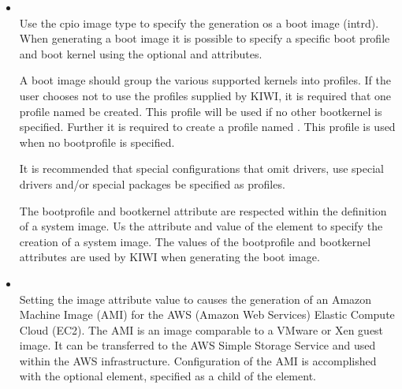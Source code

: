 \begin{itemize}
\item {}\\
      Use the cpio image type to specify the generation os a boot image
      (intrd). When generating a boot image it is possible to specify a
      specific boot profile and boot kernel using the optional
       and 
      attributes.
      
      A boot image should group the various supported kernels into profiles. 
      If the user chooses not to use the profiles supplied by KIWI, it is
      required that one profile named  be created. This profile
      will be used if no other bootkernel is specified. Further it is 
      required to create a  profile named . This profile is
      used when no bootprofile is specified.

      It is recommended that special configurations that omit drivers, use
      special drivers and/or special packages be specified as profiles.


      The bootprofile and bootkernel attribute are respected within the 
      definition of a system image. Us the attribute and value 
       of the  element to specify the
      creation of a system image. The values of the bootprofile and 
      bootkernel attributes are used by KIWI when generating the boot image.
\item {}\\
      Setting the image attribute value to  causes the generation of
      an Amazon Machine Image (AMI) for the AWS (Amazon Web Services) 
      Elastic Compute Cloud (EC2). The AMI is an image comparable to
      a VMware or Xen guest image. It can be transferred to the AWS 
      Simple Storage Service and used within the AWS infrastructure.
      Configuration of the AMI is accomplished with the optional
       element, specified as a child of the 
      element.


\end{itemize}
